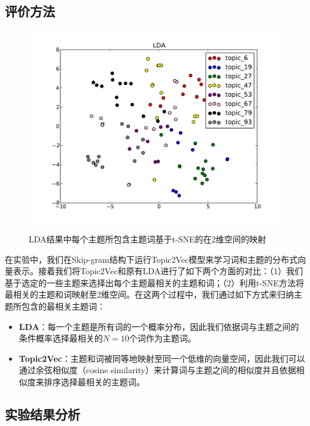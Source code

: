 \documentclass[master]{njuthesis}
\begin{document}
\subsection{评价方法}

\begin{figure}[t]
  \centering
  \includegraphics[width= 1.0\textwidth]{figures//lda_tsne_chap3.pdf}\\
  \caption{LDA结果中每个主题所包含主题词基于t-SNE的在2维空间的映射}\label{fig:lda_tsne_chap3}
\end{figure}

在实验中，我们在Skip-gram结构下运行Topic2Vec模型来学习词和主题的分布式向量表示。接着我们将Topic2Vec和原有LDA进行了如下两个方面的对比：（1）我们基于选定的一些主题来选择出每个主题最相关的主题和词；（2）利用t-SNE\cite{van2008visualizing}方法将最相关的主题和词映射至2维空间。在这两个过程中，我们通过如下方式来归纳主题所包含的最相关主题词：

	\begin{itemize}
	\item \textbf{LDA}：每一个主题是所有词的一个概率分布，因此我们依据词与主题之间的条件概率选择最相关的$N=10$个词作为主题词。
	\item \textbf{Topic2Vec}：主题和词被同等地映射至同一个低维的向量空间，因此我们可以通过余弦相似度（cosine similarity）来计算词与主题之间的相似度并且依据相似度来排序选择最相关的主题词。
	\end{itemize}

\subsection{实验结果分析}
\end{document}
